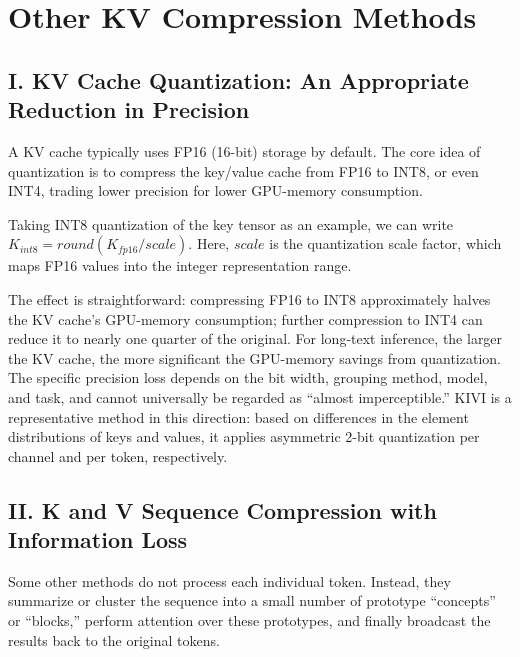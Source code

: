\setcounter{section}{5}

\hypertarget{other-kv-compression-methods}{%
\section{Other KV Compression Methods}\label{other-kv-compression-methods}}

\hypertarget{i.-kv-cache-quantization-an-appropriate-reduction-in-precision}{%
\subsection{I. KV Cache Quantization: An Appropriate Reduction in Precision}\label{i.-kv-cache-quantization-an-appropriate-reduction-in-precision}}

A KV cache typically uses FP16 (16-bit) storage by default. The core idea of quantization is to compress the key/value cache from FP16 to INT8, or even INT4, trading lower precision for lower GPU-memory consumption.

Taking INT8 quantization of the key tensor as an example, we can write \(K_{int8}=round(K_{fp16}/scale)\). Here, \(scale\) is the quantization scale factor, which maps FP16 values into the integer representation range.

The effect is straightforward: compressing FP16 to INT8 approximately halves the KV cache's GPU-memory consumption; further compression to INT4 can reduce it to nearly one quarter of the original. For long-text inference, the larger the KV cache, the more significant the GPU-memory savings from quantization. The specific precision loss depends on the bit width, grouping method, model, and task, and cannot universally be regarded as ``almost imperceptible.'' KIVI is a representative method in this direction: based on differences in the element distributions of keys and values, it applies asymmetric 2-bit quantization per channel and per token, respectively.

\hypertarget{ii.-k-and-v-sequence-compression-with-information-loss}{%
\subsection{II. K and V Sequence Compression with Information Loss}\label{ii.-k-and-v-sequence-compression-with-information-loss}}

Some other methods do not process each individual token. Instead, they summarize or cluster the sequence into a small number of prototype ``concepts'' or ``blocks,'' perform attention over these prototypes, and finally broadcast the results back to the original tokens.

